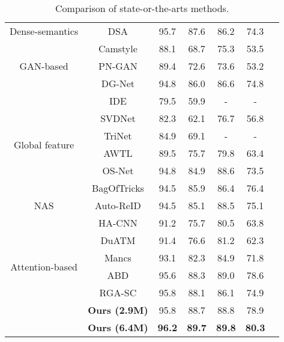\documentclass[sigconf]{acmart}
\begin{document}
\begin{table}[tb]
\begin{center}
\begin{tabular}{ ccc|cc|cc}
    	\multirow{2}{1cm}{Dense-semantics}& \multirow{2}{1.2cm}{DSA \cite{zhang2019densely}}  & \multirow{2}{0.5cm}{95.7}	& \multirow{2}{0.5cm}{87.6}	&\multirow{2}{0.5cm}{86.2}	&\multirow{2}{0.5cm}{74.3}		\\ & & & & & \\
\hline
    \multirow{3}{1cm}{GAN-based}& Camstyle \cite{zhong2018camstyle} &88.1 	&68.7	&75.3	&53.5		\\
                                & PN-GAN \cite{qian2018pose}        &89.4 	&72.6	&73.6	&53.2		\\
                                & DG-Net \cite{zheng2019joint}        &94.8 	&86.0	&86.6 	&74.8		\\
    \hline
    \multirow{6}{1cm}{Global feature}& IDE \cite{zheng2018discriminatively}  & 79.5	& 59.9	& -	&-		\\
                                & SVDNet \cite{sun2017svdnet}   & 82.3	& 62.1	& 76.7	&56.8		\\
                                & TriNet\cite{hermans2017defense}  & 84.9	& 69.1	& -	& -		\\
                                & AWTL\cite{ristani2018features}  & 89.5	& 75.7	& 79.8	& 63.4		\\
                                & OS-Net \cite{zhou2019omni}    &94.8	&84.9	&88.6	&73.5		\\
                                & BagOfTricks \cite{luo2019bag}    &94.5	&85.9	&86.4	&76.4		\\
   \hline
    \multirow{1}{1cm}{NAS}& Auto-ReID \cite{quan2019auto}  & 94.5	& 85.1	& 88.5	& 75.1		\\
   \hline
    \multirow{6}{1cm}{Attention-based}& HA-CNN \cite{li2018harmonious}   & 91.2	& 75.7	&80.5	&63.8		\\
                                & DuATM \cite{si2018dual}          & 91.4	& 76.6	&81.2	&62.3		\\
                                & Mancs \cite{wang2018mancs} &93.1   &82.3	&84.9	&71.8		\\
                                & ABD \cite{chen2019abd} &95.6   &88.3	& 89.0	&78.6		\\
                                & RGA-SC \cite{zhang2019relation} &95.8   &88.1	& 86.1	&74.9		\\
                                 & \textbf{Ours (2.9M)}   & 95.8	& 88.7	&88.8	&78.9		\\
                                 & \textbf{Ours (6.4M)}   & \textbf{96.2}	& \textbf{89.7}	&\textbf{89.8}	&\textbf{80.3}		\\
    \hline

  \end{tabular}
  \end{center}
  \caption{\label{tab:sota}Comparison of state-or-the-arts methods.}
\end{table}
\end{document}
